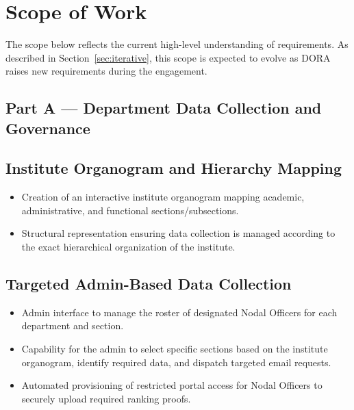 \documentclass[11pt]{article}
\begin{document}
\section{Scope of Work}
\label{sec:scope}
The scope below reflects the current high-level understanding of requirements. As described in Section~\ref{sec:iterative}, this scope is expected to evolve as DORA raises new requirements during the engagement.

\subsection*{Part A --- Department Data Collection and Governance}

\subsection{Institute Organogram and Hierarchy Mapping}
\begin{itemize}[leftmargin=1.4em, itemsep=3pt]
\item Creation of an interactive institute organogram mapping academic, administrative, and functional sections/subsections.
\item Structural representation ensuring data collection is managed according to the exact hierarchical organization of the institute.
\end{itemize}

\subsection{Targeted Admin-Based Data Collection}
\begin{itemize}[leftmargin=1.4em, itemsep=3pt]
\item Admin interface to manage the roster of designated Nodal Officers for each department and section.
\item Capability for the admin to select specific sections based on the institute organogram, identify required data, and dispatch targeted email requests.
\item Automated provisioning of restricted portal access for Nodal Officers to securely upload required ranking proofs.
\end{itemize}
\end{document}
